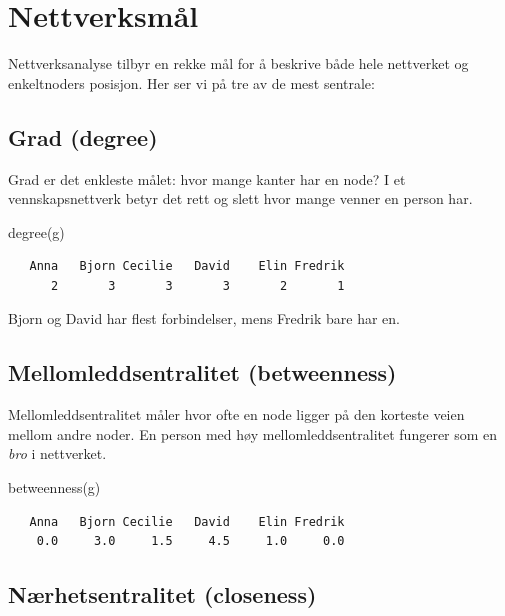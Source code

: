 \documentclass[
  norsk,
  letterpaper,
  DIV=11,
  numbers=noendperiod]{scrreprt}
\newenvironment{Shaded}{\begin{snugshade}}{\end{snugshade}}
\newcommand{\FunctionTok}[1]{\textcolor[rgb]{0.28,0.35,0.67}{#1}}
\newcommand{\NormalTok}[1]{\textcolor[rgb]{0.00,0.23,0.31}{#1}}
\theoremstyle{definition}
\theoremstyle{remark}
\begin{document}
\section{Nettverksmål}\label{nettverksmuxe5l}

Nettverksanalyse tilbyr en rekke mål for å beskrive både hele nettverket
og enkeltnoders posisjon. Her ser vi på tre av de mest sentrale:

\subsection{Grad (degree)}\label{grad-degree}

Grad er det enkleste målet: hvor mange kanter har en node? I et
vennskapsnettverk betyr det rett og slett hvor mange venner en person
har.

\begin{Shaded}
\begin{Highlighting}[]
\FunctionTok{degree}\NormalTok{(g)}
\end{Highlighting}
\end{Shaded}

\begin{verbatim}
   Anna   Bjorn Cecilie   David    Elin Fredrik 
      2       3       3       3       2       1 
\end{verbatim}

Bjorn og David har flest forbindelser, mens Fredrik bare har en.

\subsection{Mellomleddsentralitet
(betweenness)}\label{mellomleddsentralitet-betweenness}

Mellomleddsentralitet måler hvor ofte en node ligger på den korteste
veien mellom andre noder. En person med høy mellomleddsentralitet
fungerer som en \emph{bro} i nettverket.

\begin{Shaded}
\begin{Highlighting}[]
\FunctionTok{betweenness}\NormalTok{(g)}
\end{Highlighting}
\end{Shaded}

\begin{verbatim}
   Anna   Bjorn Cecilie   David    Elin Fredrik 
    0.0     3.0     1.5     4.5     1.0     0.0 
\end{verbatim}

\subsection{Nærhetsentralitet
(closeness)}\label{nuxe6rhetsentralitet-closeness}
\end{document}
